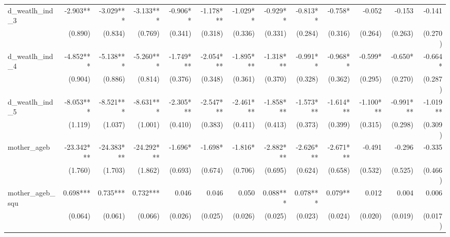 \begin{tabular}{lrrrrrrrrrrrr}
d\_weatlh\_ind\_3                           &     -2.903** &    -3.029*** &    -3.133*** &     -0.906** &    -1.178*** &     -1.029** &     -0.929** &     -0.813** &      -0.758* &       -0.052 &       -0.153 &       -0.141 \\ 
                                            &      (0.890) &      (0.834) &      (0.769) &      (0.341) &      (0.318) &      (0.336) &      (0.331) &      (0.284) &      (0.316) &      (0.264) &      (0.263) &      (0.270) \\ 
d\_weatlh\_ind\_4                           &    -4.852*** &    -5.138*** &    -5.260*** &    -1.749*** &    -2.054*** &    -1.895*** &    -1.318*** &     -0.991** &     -0.968** &      -0.599* &      -0.650* &      -0.664* \\ 
                                            &      (0.904) &      (0.886) &      (0.814) &      (0.376) &      (0.348) &      (0.361) &      (0.370) &      (0.328) &      (0.362) &      (0.295) &      (0.270) &      (0.287) \\ 
d\_weatlh\_ind\_5                           &    -8.053*** &    -8.521*** &    -8.631*** &    -2.305*** &    -2.547*** &    -2.461*** &    -1.858*** &    -1.573*** &    -1.614*** &    -1.100*** &    -0.991*** &     -1.019** \\ 
                                            &      (1.119) &      (1.037) &      (1.001) &      (0.410) &      (0.383) &      (0.411) &      (0.413) &      (0.373) &      (0.399) &      (0.315) &      (0.298) &      (0.309) \\ 
mother\_ageb                                &   -23.342*** &   -24.383*** &   -24.292*** &      -1.696* &      -1.698* &      -1.816* &    -2.882*** &    -2.626*** &    -2.671*** &       -0.491 &       -0.296 &       -0.335 \\ 
                                            &      (1.760) &      (1.703) &      (1.862) &      (0.693) &      (0.674) &      (0.706) &      (0.695) &      (0.624) &      (0.658) &      (0.532) &      (0.525) &      (0.466) \\ 
mother\_ageb\_squ                           &     0.698*** &     0.735*** &     0.732*** &        0.046 &        0.046 &        0.050 &     0.088*** &     0.078*** &      0.079** &        0.012 &        0.004 &        0.006 \\ 
                                            &      (0.064) &      (0.061) &      (0.066) &      (0.026) &      (0.025) &      (0.026) &      (0.025) &      (0.023) &      (0.024) &      (0.020) &      (0.019) &      (0.017) \\ 

\end{tabular}
